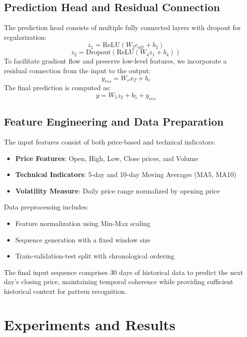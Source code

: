 \documentclass[10pt,twocolumn,letterpaper]{article}
\begin{document}
\subsection{Prediction Head and Residual Connection}
The prediction head consists of multiple fully connected layers with dropout for regularization:
\begin{equation}
	z_1 = \text{ReLU}(W_3c_{att} + b_3)
\end{equation}
\begin{equation}
	z_2 = \text{Dropout}(\text{ReLU}(W_4z_1 + b_4))
\end{equation}
To facilitate gradient flow and preserve low-level features, we incorporate a residual connection from the input to the output:
\begin{equation}
	y_{res} = W_rx_{T} + b_r
\end{equation}
The final prediction is computed as:
\begin{equation}
	y = W_5z_2 + b_5 + y_{res}
\end{equation}
\subsection{Feature Engineering and Data Preparation}
The input features consist of both price-based and technical indicators:
\begin{itemize}
	\item \textbf{Price Features}: Open, High, Low, Close prices, and Volume
	\item \textbf{Technical Indicators}: 5-day and 10-day Moving Averages (MA5, MA10)
	\item \textbf{Volatility Measure}: Daily price range normalized by opening price
\end{itemize}
Data preprocessing includes:
\begin{itemize}
	\item Feature normalization using Min-Max scaling
	\item Sequence generation with a fixed window size
	\item Train-validation-test split with chronological ordering
\end{itemize}
The final input sequence comprises 30 days of historical data to predict the next day's closing price, maintaining temporal coherence while providing sufficient historical context for pattern recognition.

\section{Experiments and Results}
\end{document}
